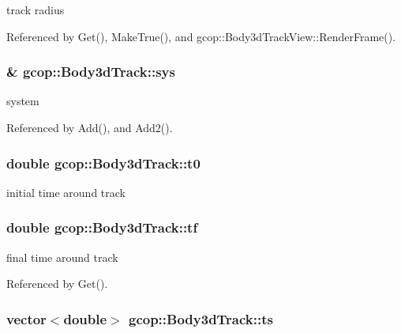 track radius 



\-Referenced by \-Get(), \-Make\-True(), and gcop\-::\-Body3d\-Track\-View\-::\-Render\-Frame().

\subsubsection[{sys}]{\& {\bf gcop\-::\-Body3d\-Track\-::sys}}\label{classgcop_1_1Body3dTrack_a9c6a3480b350f9837d980670bc08749d}


system 



\-Referenced by \-Add(), and \-Add2().

\subsubsection[{t0}]{\setlength{\rightskip}{0pt plus 5cm}double {\bf gcop\-::\-Body3d\-Track\-::t0}}\label{classgcop_1_1Body3dTrack_adaf5bdb83486dd86463216c430c7e7e1}


initial time around track 

\subsubsection[{tf}]{\setlength{\rightskip}{0pt plus 5cm}double {\bf gcop\-::\-Body3d\-Track\-::tf}}\label{classgcop_1_1Body3dTrack_adb9af8ba7cc13b756c87d80ec523d514}


final time around track 



\-Referenced by \-Get().

\subsubsection[{ts}]{\setlength{\rightskip}{0pt plus 5cm}vector$<$double$>$ {\bf gcop\-::\-Body3d\-Track\-::ts}}\label{classgcop_1_1Body3dTrack_a160277862bdb33a159f99e39f2977a01}


